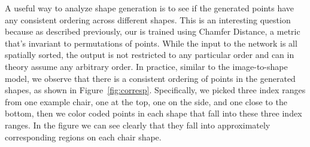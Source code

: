 A useful way to analyze shape generation is to see if the generated points have any consistent ordering across different shapes. 
This is an interesting question because as described previously, our \mrvae is trained using Chamfer Distance, 
a metric that's invariant to permutations of points. 
While the input to the network is all spatially sorted, the output is not restricted to any particular order and can in theory assume any arbitrary order. 
In practice, similar to the image-to-shape model, we observe that there is a consistent ordering of points in the generated shapes, as shown in Figure~\ref{fig:corresp}. 
Specifically, we picked three index ranges from one example chair, one at the top, one on the side, and one close to the bottom, 
then we color coded points in each shape that fall into these three index ranges. 
In the figure we can see clearly that they fall into approximately corresponding regions on each chair shape.

